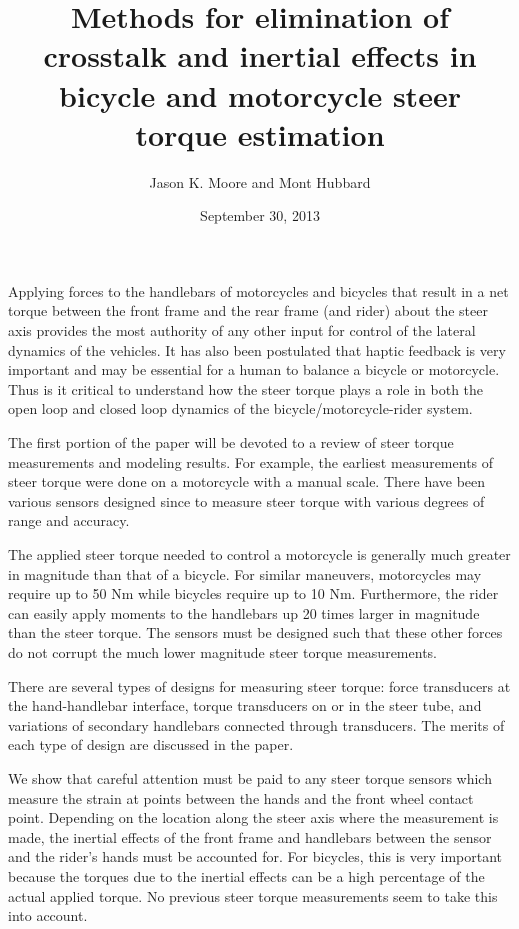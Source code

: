 \documentclass[a4paper]{article}
\title{Methods for elimination of crosstalk and inertial effects in bicycle and
motorcycle steer torque estimation}
\author{Jason K. Moore and Mont Hubbard}
\date{September 30, 2013}
\begin{document}
\maketitle

Applying forces to the handlebars of motorcycles and bicycles that result in a
net torque between the front frame and the rear frame (and rider) about the
steer axis provides the most authority of any other input for control of the
lateral dynamics of the vehicles. It has also been postulated that haptic
feedback is very important and may be essential for a human to balance a
bicycle or motorcycle.  Thus is it critical to understand how the steer torque
plays a role in both the open loop and closed loop dynamics of the
bicycle/motorcycle-rider system.

The first portion of the paper will be devoted to a review of steer torque
measurements and modeling results. For example, the earliest measurements of
steer torque were done on a motorcycle \cite{Wilson-Jones1951} with a manual
scale. There have been various sensors designed since to measure steer torque
with various degrees of range and accuracy.

The applied steer torque needed to control a motorcycle is generally much
greater in magnitude than that of a bicycle. For similar maneuvers, motorcycles
may require up to 50 Nm while bicycles require up to 10 Nm. Furthermore, the
rider can easily apply moments to the handlebars up 20 times larger in
magnitude than the steer torque. The sensors must be designed such that these
other forces do not corrupt the much lower magnitude steer torque measurements.

There are several types of designs for measuring steer torque: force
transducers at the hand-handlebar interface, torque transducers on or in the
steer tube, and variations of secondary handlebars connected through
transducers. The merits of each type of design are discussed in the paper.

We show that careful attention must be paid to any steer torque sensors which
measure the strain at points between the hands and the front wheel contact
point.  Depending on the location along the steer axis where the measurement is
made, the inertial effects of the front frame and handlebars between the sensor
and the rider's hands must be accounted for. For bicycles, this is very
important because the torques due to the inertial effects can be a high
percentage of the actual applied torque. No previous steer torque measurements
seem to take this into account.
\end{document}
